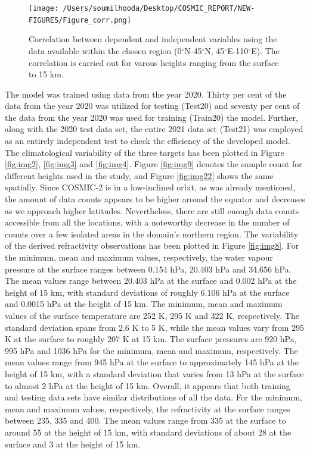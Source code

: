 \documentclass[a4paper,12pt,twoside]{article}
\begin{document}
	\begin{figure}[H]
		\texttt{[image: /Users/soumilhooda/Desktop/COSMIC\_REPORT/NEW-FIGURES/Figure\_corr.png]}
		\caption{Correlation between dependent and independent variables using the data available within the chosen region (0$^\circ$N-45$^\circ$N, 45$^\circ$E-110$^\circ$E). The correlation is carried out for varous heights ranging from the surface to 15 km.}
		\label{fig:img5}
	\end{figure}

\noindent  The model was trained using data from the year 2020. Thirty per cent of the data from the year 2020 was utilized for testing (Test20) and seventy per cent of the data from the year 2020 was used for training (Train20) the model. Further, along with the 2020 test data set, the entire 2021 data set (Test21) was employed as an entirely independent test to check the efficiency of the developed model. The climatological variability of the three targets has been plotted in Figure \ref{fig:img2}, \ref{fig:img3} and \ref{fig:img4}.  Figure \ref{fig:img9} denotes the sample count for different heights used in the study, and Figure \ref{fig:img22} shows the same spatially. Since COSMIC-2 is in a low-inclined orbit, as was already mentioned, the amount of data counts appears to be higher around the equator and decreases as we approach higher latitudes. Nevertheless, there are still enough data counts accessible from all the locations, with a noteworthy decrease in the number of counts over a few isolated areas in the domain's northern region. The variability of the derived refractivity observations has been plotted in Figure \ref{fig:img8}. For the minimum, mean and maximum values, respectively, the water vapour pressure at the surface ranges between 0.154 hPa, 20.403 hPa and 34.656 hPa. The mean values range between 20.403 hPa at the surface and 0.002 hPa at the height of 15 km, with standard deviations of roughly 6.106 hPa at the surface and 0.0015 hPa at the height of 15 km. The minimum, mean and maximum values of the surface temperature are 252 K, 295 K and 322 K, respectively. The standard deviation spans from 2.6 K to 5 K, while the mean values vary from 295 K at the surface to roughly 207 K at 15 km. The surface pressures are 920 hPa, 995 hPa and 1036 hPa for the minimum, mean and maximum, respectively. The mean values range from 945 hPa at the surface to approximately 145 hPa at the height of 15 km, with a standard deviation that varies from 13 hPa at the surface to almost 2 hPa at the height of 15 km. Overall, it appears that both training and testing data sets have similar distributions of all the data. For the minimum, mean and maximum values, respectively, the refractivity at the surface ranges between 235, 335 and 400. The mean values range from 335 at the surface to around 55 at the height of 15 km, with standard deviations of about 28 at the surface and 3 at the height of 15 km. \\
\end{document}
